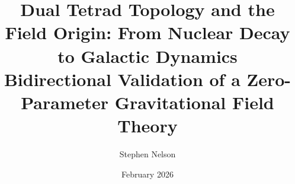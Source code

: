 \documentclass[aps,prd,preprint,superscriptaddress,showpacs,preprintnumbers,amsmath,amssymb,nofootinbib]{revtex4-2}
\begin{document}
\raggedbottom

\vspace*{3cm}

\title{\LARGE Dual Tetrad Topology and the Field Origin: From Nuclear Decay to Galactic Dynamics\\[0.5em]
\normalsize Bidirectional Validation of a Zero-Parameter Gravitational Field Theory}

\author{Stephen Nelson}

\date{February 2026}
\end{document}
